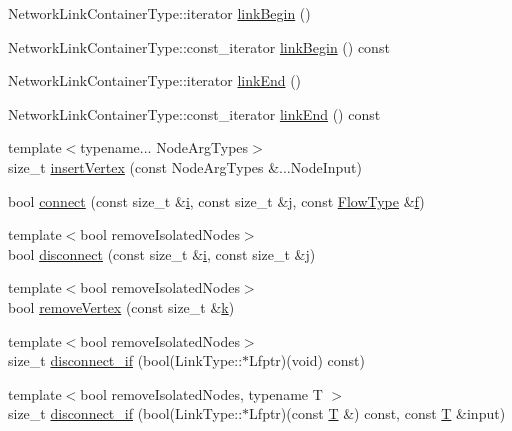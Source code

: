\begin{DoxyCompactItemize}
\item 
Network\+Link\+Container\+Type\+::iterator \hyperlink{classmodel_1_1_network_a72322d37e53ef95105fc889ca651c36d}{link\+Begin} ()
\item 
Network\+Link\+Container\+Type\+::const\+\_\+iterator \hyperlink{classmodel_1_1_network_ac5ec0992a7f3b8f5a0f112094dd3dd9e}{link\+Begin} () const 
\item 
Network\+Link\+Container\+Type\+::iterator \hyperlink{classmodel_1_1_network_abbe69fb28a411e68d0d82f4646411e6e}{link\+End} ()
\item 
Network\+Link\+Container\+Type\+::const\+\_\+iterator \hyperlink{classmodel_1_1_network_a979b8daca92bfad0b7b156798276021d}{link\+End} () const 
\item 
{\footnotesize template$<$typename... Node\+Arg\+Types$>$ }\\size\+\_\+t \hyperlink{classmodel_1_1_network_a91ae10bf4aeee41db952232ad2f61ef9}{insert\+Vertex} (const Node\+Arg\+Types \&...Node\+Input)
\item 
bool \hyperlink{classmodel_1_1_network_af48273eaacbb592fb063b3f55314b1fb}{connect} (const size\+\_\+t \&\hyperlink{_cubic_spline_intersection_8m_a6f6ccfcf58b31cb6412107d9d5281426}{i}, const size\+\_\+t \&j, const \hyperlink{_spline_segment_base__common_8h_aec2b17f3c09c54f93636cbedceffde56}{Flow\+Type} \&\hyperlink{_f_e_m_2linear__elasticity__3d_2tetgen_2generate_p_o_l_ycube_8m_aeeaa64cc5eea020d7146207f8f8d3959}{f})
\item 
{\footnotesize template$<$bool remove\+Isolated\+Nodes$>$ }\\bool \hyperlink{classmodel_1_1_network_a4afdf959ca3347f8cc0a185b9b0eac74}{disconnect} (const size\+\_\+t \&\hyperlink{_cubic_spline_intersection_8m_a6f6ccfcf58b31cb6412107d9d5281426}{i}, const size\+\_\+t \&j)
\item 
{\footnotesize template$<$bool remove\+Isolated\+Nodes$>$ }\\bool \hyperlink{classmodel_1_1_network_a3fcb30c9453b909982e4ba40a162ebdf}{remove\+Vertex} (const size\+\_\+t \&\hyperlink{_f_e_m_2linear__elasticity__3d_2tetgen_2generate_p_o_l_ycube_8m_a5d2aad4440da75aa43f2643e72b1a3bd}{k})
\item 
{\footnotesize template$<$bool remove\+Isolated\+Nodes$>$ }\\size\+\_\+t \hyperlink{classmodel_1_1_network_ae37c09e5dabff2307428e7a35c0b462a}{disconnect\+\_\+if} (bool(Link\+Type\+::$\ast$Lfptr)(void) const)
\item 
{\footnotesize template$<$bool remove\+Isolated\+Nodes, typename T $>$ }\\size\+\_\+t \hyperlink{classmodel_1_1_network_a9b38e8564e8995f30c93c5dee34ff82d}{disconnect\+\_\+if} (bool(Link\+Type\+::$\ast$Lfptr)(const \hyperlink{_spline_node_base__corder1_8h_a82692d3a5502b91460591f1d5504314a}{T} \&) const, const \hyperlink{_spline_node_base__corder1_8h_a82692d3a5502b91460591f1d5504314a}{T} \&input)

\end{DoxyCompactItemize}
